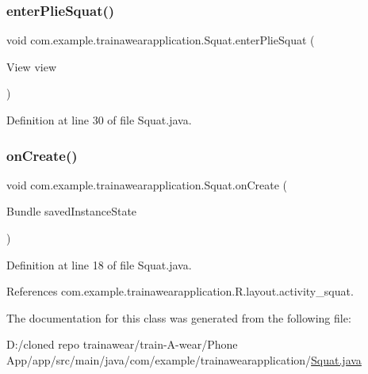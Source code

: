 \subsubsection{\texorpdfstring{enterPlieSquat()}{enterPlieSquat()}}
{\footnotesize\ttfamily void com.\+example.\+trainawearapplication.\+Squat.\+enter\+Plie\+Squat (\begin{DoxyParamCaption}\item[{View}]{view }\end{DoxyParamCaption})}



Definition at line 30 of file Squat.\+java.


\begin{DoxyCode}{0}

\end{DoxyCode}
\mbox{\label{classcom_1_1example_1_1trainawearapplication_1_1_squat_a2ee401e1a295432f8196e77dcca9df5f}} 
\subsubsection{\texorpdfstring{onCreate()}{onCreate()}}
{\footnotesize\ttfamily void com.\+example.\+trainawearapplication.\+Squat.\+on\+Create (\begin{DoxyParamCaption}\item[{Bundle}]{saved\+Instance\+State }\end{DoxyParamCaption})\hspace{0.3cm}{\ttfamily [protected]}}



Definition at line 18 of file Squat.\+java.


\begin{DoxyCode}{0}

\end{DoxyCode}


References com.\+example.\+trainawearapplication.\+R.\+layout.\+activity\+\_\+squat.



The documentation for this class was generated from the following file\+:\begin{DoxyCompactItemize}
\item 
D\+:/cloned repo trainawear/train-\/\+A-\/wear/\+Phone App/app/src/main/java/com/example/trainawearapplication/\mbox{\hyperlink{_squat_8java}{Squat.\+java}}\end{DoxyCompactItemize}
